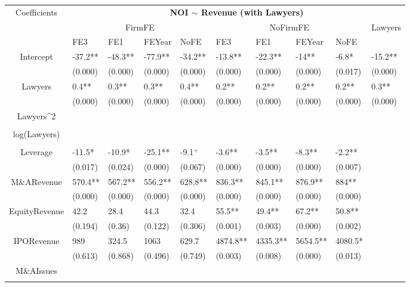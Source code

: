 \documentclass{article}
\begin{document}
\begin{table}[H]
\centering
\begin{tabular}{|clllllllll|}
\hline
\multirow{3}{*}{Coefficients} & \multicolumn{9}{c|}{\textbf{NOI $\sim$ Revenue (with Lawyers)}} \\
\cline{2-10}
& \multicolumn{4}{c}{FirmFE} & \multicolumn{4}{c}{NoFirmFE} & \multirow{2}{*}{Lawyers} \\
\cline{2-9}
& FE3 & FE1 & FEYear & NoFE & FE3 & FE1 & FEYear & NoFE &  \\
\hline
 
Intercept & -37.2** & -48.3** & -77.9** & -34.2** & -13.8** & -22.3** & -14** & -6.8* & -15.2** \\ 
   & (0.000) & (0.000) & (0.000) & (0.000) & (0.000) & (0.000) & (0.000) & (0.017) & (0.000) \\ 
  Lawyers & 0.4** & 0.3** & 0.3** & 0.4** & 0.2** & 0.2** & 0.2** & 0.2** & 0.3** \\ 
   & (0.000) & (0.000) & (0.000) & (0.000) & (0.000) & (0.000) & (0.000) & (0.000) & (0.000) \\ 
  Lawyers^2 &  &  &  &  &  &  &  &  &  \\ 
   &  &  &  &  &  &  &  &  &  \\ 
  log(Lawyers) &  &  &  &  &  &  &  &  &  \\ 
   &  &  &  &  &  &  &  &  &  \\ 
  Leverage & -11.5* & -10.9* & -25.1** & -9.1$^{+}$ & -3.6** & -3.5** & -8.3** & -2.2** &  \\ 
   & (0.017) & (0.024) & (0.000) & (0.067) & (0.000) & (0.000) & (0.000) & (0.007) &  \\ 
  M\&ARevenue & 570.4** & 567.2** & 556.2** & 628.8** & 836.3** & 845.1** & 876.9** & 884** &  \\ 
   & (0.000) & (0.000) & (0.000) & (0.000) & (0.000) & (0.000) & (0.000) & (0.000) &  \\ 
  EquityRevenue & 42.2 & 28.4 & 44.3 & 32.4 & 55.5** & 49.4** & 67.2** & 50.8** &  \\ 
   & (0.194) & (0.36) & (0.122) & (0.306) & (0.001) & (0.003) & (0.000) & (0.002) &  \\ 
  IPORevenue & 989 & 324.5 & 1063 & 629.7 & 4874.8** & 4335.3** & 5654.5** & 4080.5* &  \\ 
   & (0.613) & (0.868) & (0.496) & (0.749) & (0.003) & (0.008) & (0.000) & (0.013) &  \\ 
  M\&AIssues &  &  &  &  &  &  &  &  &  \\ 
   &  &  &  &  &  &  &  &  &  \\ 

\end{tabular}
\end{table}
\end{document}
